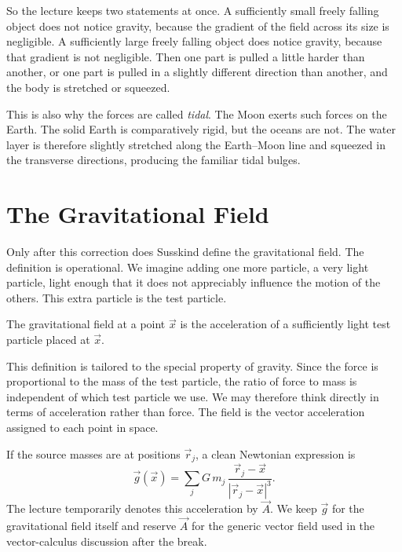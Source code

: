 So the lecture keeps two statements at once. A sufficiently small freely falling object does not notice gravity, because the gradient of the field across its size is negligible. A sufficiently large freely falling object does notice gravity, because that gradient is not negligible. Then one part is pulled a little harder than another, or one part is pulled in a slightly different direction than another, and the body is stretched or squeezed.

This is also why the forces are called \emph{tidal}. The Moon exerts such forces on the Earth. The solid Earth is comparatively rigid, but the oceans are not. The water layer is therefore slightly stretched along the Earth--Moon line and squeezed in the transverse directions, producing the familiar tidal bulges.

\section{The Gravitational Field}

Only after this correction does Susskind define the gravitational field. The definition is operational. We imagine adding one more particle, a very light particle, light enough that it does not appreciably influence the motion of the others. This extra particle is the test particle.

\begin{definition}
The gravitational field at a point \(\vec x\) is the acceleration of a sufficiently light test particle placed at \(\vec x\).
\end{definition}

This definition is tailored to the special property of gravity. Since the force is proportional to the mass of the test particle, the ratio of force to mass is independent of which test particle we use. We may therefore think directly in terms of acceleration rather than force. The field is the vector acceleration assigned to each point in space.

If the source masses are at positions \(\vec r_j\), a clean Newtonian expression is
\begin{equation}
\vec g(\vec x)
=
\sum_j G\,m_j\,
\frac{\vec r_j-\vec x}{|\vec r_j-\vec x|^3}.
\end{equation}
The lecture temporarily denotes this acceleration by \(\vec A\). We keep \(\vec g\) for the gravitational field itself and reserve \(\vec A\) for the generic vector field used in the vector-calculus discussion after the break.

